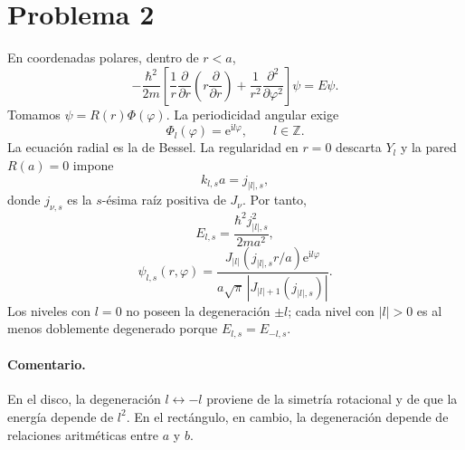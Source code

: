 \documentclass[11pt,a4paper]{article}
\numberwithin{equation}{section}
\renewcommand{\boxed}[1]{#1}
\newcommand{\ii}{\mathrm i}
\newcommand{\e}{\mathrm e}
\newcommand{\hb}{\hbar}
\begin{document}
\section{Problema 2}
En coordenadas polares, dentro de $r<a$,
\begin{equation}
-\frac{\hb^2}{2m}\left[\frac1r\frac{\partial}{\partial r}
\left(r\frac{\partial}{\partial r}\right)+\frac1{r^2}\frac{\partial^2}{\partial\varphi^2}\right]\psi=E\psi.
\end{equation}
Tomamos $\psi=R(r)\Phi(\varphi)$. La periodicidad angular exige
\begin{equation}
\Phi_l(\varphi)=\e^{\ii l\varphi},\qquad l\in\mathbb Z.
\end{equation}
La ecuación radial es la de Bessel. La regularidad en $r=0$ descarta $Y_l$ y la pared $R(a)=0$ impone
\begin{equation}
k_{l,s}a=j_{|l|,s},
\end{equation}
donde $j_{\nu,s}$ es la $s$-ésima raíz positiva de $J_\nu$. Por tanto,
\begin{equation}
\boxed{E_{l,s}=\frac{\hb^2j_{|l|,s}^2}{2ma^2},}
\end{equation}
\begin{equation}
\boxed{\psi_{l,s}(r,\varphi)=
\frac{J_{|l|}(j_{|l|,s}r/a)\e^{\ii l\varphi}}
{a\sqrt\pi\,|J_{|l|+1}(j_{|l|,s})|}.}
\end{equation}
Los niveles con $l=0$ no poseen la degeneración $\pm l$; cada nivel con $|l|>0$ es al menos doblemente degenerado porque $E_{l,s}=E_{-l,s}$.

\paragraph{Comentario.}
En el disco, la degeneración $l\leftrightarrow-l$ proviene de la simetría rotacional y de que la energía depende de $l^2$. En el rectángulo, en cambio, la degeneración depende de relaciones aritméticas entre $a$ y $b$.
\end{document}

